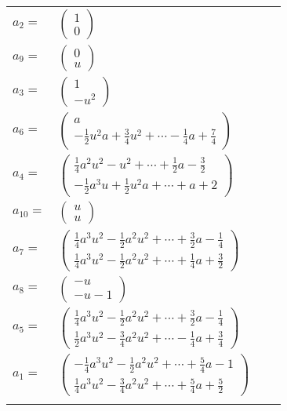 \documentclass[1p]{elsarticle_modified}
\theoremstyle{definition}
\begin{document}
\begin{tabular}{m{7pt} m{180pt} m{7pt} m{180pt} }
\flushright $a_{2}=$&$\begin{pmatrix}1\\0\end{pmatrix}$ \\
\flushright $a_{9}=$&$\begin{pmatrix}0\\u\end{pmatrix}$ \\
\flushright $a_{3}=$&$\begin{pmatrix}1\\- u^2\end{pmatrix}$ \\
\flushright $a_{6}=$&$\begin{pmatrix}a\\-\frac{1}{2} u^2 a+\frac{3}{4} u^2+\cdots-\frac{1}{4} a+\frac{7}{4}\end{pmatrix}$ \\
\flushright $a_{4}=$&$\begin{pmatrix}\frac{1}{4} a^2 u^2- u^2+\cdots+\frac{1}{2} a-\frac{3}{2}\\-\frac{1}{2} a^3 u+\frac{1}{2} u^2 a+\cdots+a+2\end{pmatrix}$ \\
\flushright $a_{10}=$&$\begin{pmatrix}u\\u\end{pmatrix}$ \\
\flushright $a_{7}=$&$\begin{pmatrix}\frac{1}{4} a^3 u^2-\frac{1}{2} a^2 u^2+\cdots+\frac{3}{2} a-\frac{1}{4}\\\frac{1}{4} a^3 u^2-\frac{1}{2} a^2 u^2+\cdots+\frac{1}{4} a+\frac{3}{2}\end{pmatrix}$ \\
\flushright $a_{8}=$&$\begin{pmatrix}- u\\- u-1\end{pmatrix}$ \\
\flushright $a_{5}=$&$\begin{pmatrix}\frac{1}{4} a^3 u^2-\frac{1}{2} a^2 u^2+\cdots+\frac{3}{2} a-\frac{1}{4}\\\frac{1}{2} a^3 u^2-\frac{3}{4} a^2 u^2+\cdots-\frac{1}{4} a+\frac{3}{4}\end{pmatrix}$ \\
\flushright $a_{1}=$&$\begin{pmatrix}-\frac{1}{4} a^3 u^2-\frac{1}{2} a^2 u^2+\cdots+\frac{5}{4} a-1\\\frac{1}{4} a^3 u^2-\frac{3}{4} a^2 u^2+\cdots+\frac{5}{4} a+\frac{5}{2}\end{pmatrix}$\\&\end{tabular}
\end{document}
